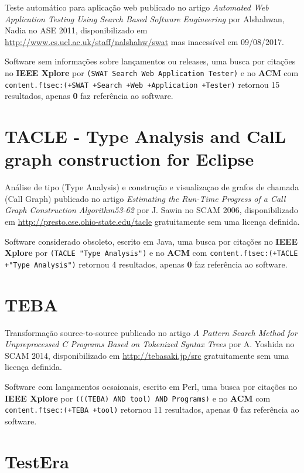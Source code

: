 Teste automático para aplicação web
publicado no artigo {\it Automated Web Application Testing Using Search Based Software Engineering}
por Alshahwan, Nadia
no ASE 2011,
disponibilizado em \url{http://www.cs.ucl.ac.uk/staff/nalshahw/swat}
mas inacessível em 09/08/2017.

Software sem informações sobre lançamentos ou releases,
uma busca por citações no {\bf IEEE Xplore} por
\texttt{(SWAT Search Web Application Tester)}
e no {\bf ACM} com
\texttt{content.ftsec:(+SWAT +Search +Web +Application +Tester)}
retornou
15 resultados, apenas
{\bf 0} faz referência ao software.



\section{TACLE - Type Analysis and CalL graph construction for Eclipse}

Análise de tipo (Type Analysis) e construção e visualizaçao de grafos de chamada (Call Graph)
publicado no artigo {\it Estimating the Run-Time Progress of a Call Graph Construction Algorithm53-62}
por J. Sawin
no SCAM 2006,
disponibilizado em \url{http://presto.cse.ohio-state.edu/tacle}
gratuitamente
sem uma licença definida.

Software considerado obsoleto,
escrito em Java,
uma busca por citações no {\bf IEEE Xplore} por
\texttt{(TACLE "Type Analysis")}
e no {\bf ACM} com
\texttt{content.ftsec:(+TACLE +"Type Analysis")}
retornou
4 resultados, apenas
{\bf 0} faz referência ao software.



\section{TEBA}

Transformação source-to-source
publicado no artigo {\it A Pattern Search Method for Unpreprocessed C Programs Based on Tokenized Syntax Trees}
por A. Yoshida
no SCAM 2014,
disponibilizado em \url{http://tebasaki.jp/src}
gratuitamente
sem uma licença definida.

Software com lançamentos ocsaionais,
escrito em Perl,
uma busca por citações no {\bf IEEE Xplore} por
\texttt{(((TEBA) AND tool) AND Programs)}
e no {\bf ACM} com
\texttt{content.ftsec:(+TEBA +tool)}
retornou
11 resultados, apenas
{\bf 0} faz referência ao software.



\section{TestEra}

